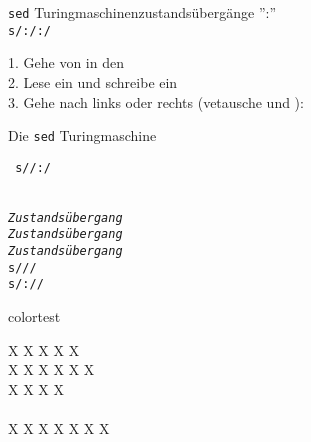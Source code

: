 \documentclass[aspectratio=169,usenames,dvipsnames]{beamer}
\begin{document}
\begin{frame}{{\tt sed} Turingmaschinenzustands\"uberg\"ange}
	\hspace{8em}
	'':''\\\pause
	\bigskip
	\texttt{s/\only<3->:\only<6->\only<5->\only<5->\only<4->\only<6->/\only<3->:\only<6->\only<5->\only<5->\only<4->\only<6->/}\\
	\pause
	\bigskip

	1. Gehe von  in den \\\pause
	{2. Lese ein  und schreibe ein }\\\pause
	{3. Gehe nach links oder rechts (vetausche  und ):}\\\pause
	
\end{frame}

\begin{frame}{ Die {\tt sed} Turingmaschine}
	
	\tt
	s//:/\\\pause
	~\\
	~\\
	\textit{Zustands\"ubergang}\only<3->{ ; t nochmal}\\
	\textit{Zustands\"ubergang}\\
	\textit{Zustands\"ubergang}\\
	\pause\pause
	s///\\\pause
	s/://\\

\end{frame}

\begin{frame}{colortest}

	{ \color{BrickRed} X}
	{ \color{red} X}
	{ \color{Maroon} X}
	{ \color{Brown} X}
	{ \color{Sepia} X}
	\\
	{ \color{PineGreen} X}
	{ \color{OliveGreen} X}
	{ \color{ForestGreen} X}
	{ \color{LimeGreen} X}
	{ \color{RoyalBlue} X}
	{ \color{NavyBlue} X}
	\\
	{ \color{BurntOrange} X}
	{ \color{YellowOrange} X}
	{ \color{Yellow} X}
	{ \color{Goldenrod} X}
	\\
	\\
	{ \color{YellowOrange} X}
	{ \color{NavyBlue} X}
	{ \color{red} X}
	{ \color{Violet} X}
	{ \color{OliveGreen} X}
	{ \color{CadetBlue} X}
	{ \color{Gray} X}
\end{frame}
\end{document}

